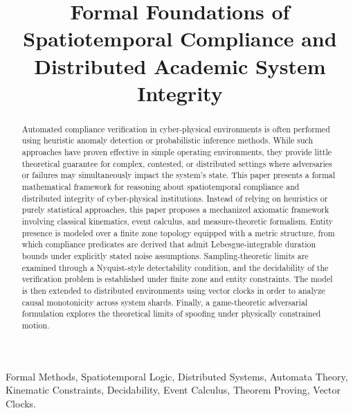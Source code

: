 \documentclass[conference]{IEEEtran}
\begin{document}
\title{Formal Foundations of Spatiotemporal Compliance and Distributed Academic System Integrity}

\author{
}

\maketitle

\begin{abstract}
Automated compliance verification in cyber-physical environments is often performed using heuristic anomaly detection or probabilistic inference methods. While such approaches have proven effective in simple operating environments, they provide little theoretical guarantee for complex, contested, or distributed settings where adversaries or failures may simultaneously impact the system’s state. This paper presents a formal mathematical framework for reasoning about spatiotemporal compliance and distributed integrity of cyber-physical institutions. Instead of relying on heuristics or purely statistical approaches, this paper proposes a mechanized axiomatic framework involving classical kinematics, event calculus, and measure-theoretic formalism. Entity presence is modeled over a finite zone topology equipped with a metric structure, from which compliance predicates are derived that admit Lebesgue-integrable duration bounds under explicitly stated noise assumptions. Sampling-theoretic limits are examined through a Nyquist-style detectability condition, and the decidability of the verification problem is established under finite zone and entity constraints. The model is then extended to distributed environments using vector clocks in order to analyze causal monotonicity across system shards. Finally, a game-theoretic adversarial formulation explores the theoretical limits of spoofing under physically constrained motion.
\end{abstract}

\begin{IEEEkeywords}
Formal Methods, Spatiotemporal Logic, Distributed Systems, Automata Theory, Kinematic Constraints, Decidability, Event Calculus, Theorem Proving, Vector Clocks.
\end{IEEEkeywords}

\end{document}
